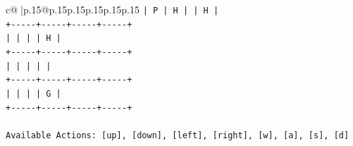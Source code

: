 \documentclass{article}
\begin{document}
{\begin{supertabular}{c@{$\;$}|p{.15\linewidth}@{}p{.15\linewidth}p{.15\linewidth}p{.15\linewidth}p{.15\linewidth}p{.15\linewidth}}
{{{\texttt{|  P  |  H  |     |  H  |} \\
\texttt{+{-}{-}{-}{-}{-}+{-}{-}{-}{-}{-}+{-}{-}{-}{-}{-}+{-}{-}{-}{-}{-}+} \\
\texttt{|     |     |     |  H  |} \\
\texttt{+{-}{-}{-}{-}{-}+{-}{-}{-}{-}{-}+{-}{-}{-}{-}{-}+{-}{-}{-}{-}{-}+} \\
\texttt{|     |     |     |     |} \\
\texttt{+{-}{-}{-}{-}{-}+{-}{-}{-}{-}{-}+{-}{-}{-}{-}{-}+{-}{-}{-}{-}{-}+} \\
\texttt{|     |     |     |  G  |} \\
\texttt{+{-}{-}{-}{-}{-}+{-}{-}{-}{-}{-}+{-}{-}{-}{-}{-}+{-}{-}{-}{-}{-}+} \\
\\ 
\texttt{Available Actions: {[}up{]}, {[}down{]}, {[}left{]}, {[}right{]}, {[}w{]}, {[}a{]}, {[}s{]}, {[}d{]}} \\
            }
        }
    }
     \\ \\


\end{supertabular}}
\end{document}
